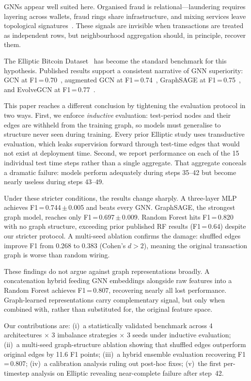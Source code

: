 \documentclass[11pt]{article}
\begin{document}
GNNs appear well suited here.  Organised fraud is
relational---laundering requires layering across wallets, fraud rings
share infrastructure, and mixing services leave topological
signatures~\citep{akoglu2015graph}.  These signals are invisible when
transactions are treated as independent rows, but neighbourhood
aggregation should, in principle, recover them.

The Elliptic Bitcoin Dataset~\citep{weber2019} has become the
standard benchmark for this hypothesis.  Published results support a
consistent narrative of GNN superiority: GCN at
F1\,=\,0.70~\citep{weber2019}, augmented GCN at
F1\,=\,0.74~\citep{alarab2020}, GraphSAGE at
F1\,=\,0.75~\citep{lo2023}, and EvolveGCN at
F1\,=\,0.77~\citep{pareja2020evolvegcn}.

This paper reaches a different conclusion by tightening the
evaluation protocol in two ways.  First, we enforce \emph{inductive}
evaluation: test-period nodes and their edges are withheld from the
training graph, so models must generalise to structure never seen
during training.  Every prior Elliptic study uses transductive
evaluation, which leaks supervision forward through test-time edges
that would not exist at deployment time.  Second, we report
performance on each of the 15 individual test time steps rather than
a single aggregate.  That aggregate conceals a dramatic failure:
models perform adequately during steps 35--42 but become nearly
useless during steps 43--49.

Under these stricter conditions, the results change sharply.  A
three-layer MLP achieves F1\,=\,0.744\,$\pm$\,0.005 and beats every
GNN.  GraphSAGE, the strongest graph model, reaches only
F1\,=\,0.697\,$\pm$\,0.009.  Random Forest hits F1\,=\,0.820 with
no graph structure, exceeding prior published RF results
(F1\,=\,0.64) despite our stricter protocol.  A multi-seed ablation
confirms the damage: shuffled edges improve F1 from 0.268 to 0.383
(Cohen's $d > 2$), meaning the original transaction graph is worse
than random wiring.

These findings do not argue against graph representations broadly.
A concatenation hybrid feeding GNN embeddings alongside raw features
into a Random Forest achieves F1\,=\,0.807, recovering nearly all
lost performance.  Graph-learned representations carry complementary
signal, but only when combined with, rather than substituted for, the
original feature space.

Our contributions are: (i)~a statistically validated benchmark
across 4 architectures $\times$ 3 imbalance strategies $\times$ 3
seeds under inductive evaluation; (ii)~a multi-seed graph-structure
ablation showing that shuffled edges outperform original edges by
11.6 F1 points; (iii)~a hybrid ensemble evaluation recovering
F1\,=\,0.807; (iv)~a calibration analysis ruling out post-hoc fixes;
(v)~the first per-timestep analysis on Elliptic revealing
near-complete failure after step~42.
\end{document}
